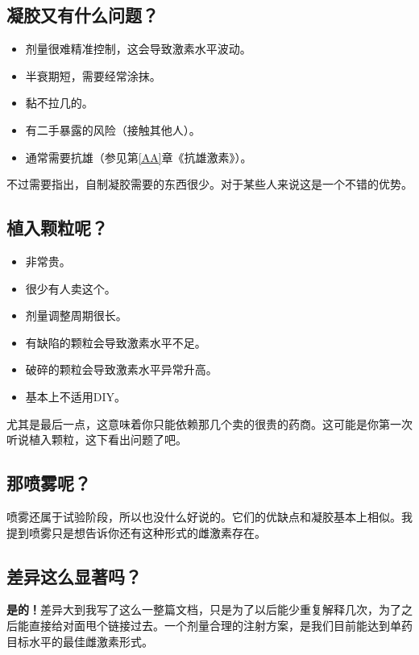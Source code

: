 \documentclass{article}
\begin{document}
\subsection{凝胶又有什么问题？}

\begin{itemize}
  \item 剂量很难精准控制，这会导致激素水平波动。
  \item 半衰期短，需要经常涂抹。
  \item 黏不拉几的。
  \item 有二手暴露的风险（接触其他人）。
  \item 通常需要抗雄（参见第\ref{AA}章《抗雄激素》）。
\end{itemize}

不过需要指出，自制凝胶需要的东西很少。对于某些人来说这是一个不错的优势。

\subsection{植入颗粒呢？}

\begin{itemize}
  \item 非常贵。
  \item 很少有人卖这个。
  \item 剂量调整周期很长。
  \item 有缺陷的颗粒会导致激素水平不足。
  \item 破碎的颗粒会导致激素水平异常升高。
  \item 基本上不适用DIY。
\end{itemize}

尤其是最后一点，这意味着你只能依赖那几个卖的很贵的药商。这可能是你第一次听说植入颗粒，这下看出问题了吧。

\subsection{那喷雾呢？}

喷雾还属于试验阶段，所以也没什么好说的。它们的优缺点和凝胶基本上相似。我提到喷雾只是想告诉你还有这种形式的雌激素存在。

\subsection{差异这么显著吗？}

\textbf{是的！}差异大到我写了这么一整篇文档，只是为了以后能少重复解释几次，为了之后能直接给对面甩个链接过去。一个剂量合理的注射方案，是我们目前能达到单药目标水平的最佳雌激素形式。
\end{document}
